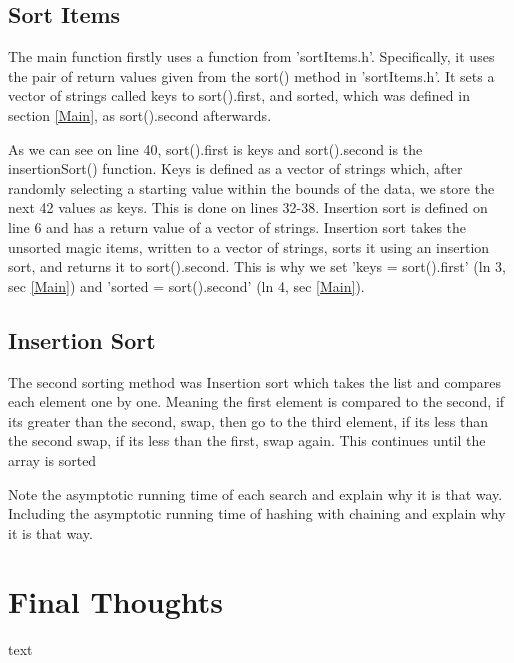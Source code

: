 \documentclass[12pt, letterpaper]{article}
\begin{document}
\subsection{Sort Items} \label{SrtItm}
The main function firstly uses a function from 'sortItems.h'.
Specifically, it uses the pair of return values given from the sort() method in 'sortItems.h'.
It sets a vector of strings called keys to sort().first, and sorted, which was defined in section \ref{Main}, as sort().second afterwards.

As we can see on line 40, sort().first is keys and sort().second is the insertionSort() function.
Keys is defined as a vector of strings which, after randomly selecting a starting value within the bounds of the data, we store the next 42 values as keys.
This is done on lines 32-38.
\newline
\indent Insertion sort is defined on line 6 and has a return value of a vector of strings.
Insertion sort takes the unsorted magic items, written to a vector of strings, sorts it using an insertion sort, and returns it to sort().second.
This is why we set 'keys = sort().first' (ln 3, sec \ref{Main}) and 'sorted = sort().second' (ln 4, sec \ref{Main}).















\subsection{Insertion Sort} \label{InsSrt}
The second sorting method was Insertion sort which takes the list and compares each element one by one. 
Meaning the first element is compared to the second, if its greater than the second, swap, then go to the third element, if its less 
than the second swap, if its less than the first, swap again. This continues until the array is sorted







Note the asymptotic running time of each search and explain why it is that way. 
Including the asymptotic running time of	hashing	with chaining and explain why it is that way.

\section{Final Thoughts}
text
\end{document}
